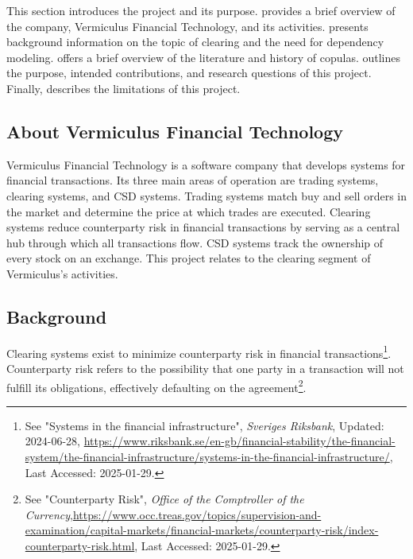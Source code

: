 This section introduces the project and its purpose.  provides a brief overview of the company, Vermiculus Financial Technology, and its activities.  presents background information on the topic of clearing and the need for dependency modeling.  offers a brief overview of the literature and history of copulas.  outlines the purpose, intended contributions, and research questions of this project. Finally,  describes the limitations of this project.

\subsection{About Vermiculus Financial Technology} \label{AboutVFT}
Vermiculus Financial Technology is a software company that develops systems for financial transactions. Its three main areas of operation are trading systems, clearing systems, and \gls{CSD} systems. Trading systems match buy and sell orders in the market and determine the price at which trades are executed. Clearing systems reduce counterparty risk in financial transactions by serving as a central hub through which all transactions flow. \gls{CSD} systems track the ownership of every stock on an exchange. This project relates to the clearing segment of Vermiculus’s activities.

\subsection{Background}\label{Background}
Clearing systems exist to minimize counterparty risk in financial transactions\footnote{See "Systems in the financial infrastructure", \textit{Sveriges Riksbank}, Updated: 2024-06-28, \url{https://www.riksbank.se/en-gb/financial-stability/the-financial-system/the-financial-infrastructure/systems-in-the-financial-infrastructure/}, Last Accessed: 2025-01-29.}. Counterparty risk refers to the possibility that one party in a transaction will not fulfill its obligations, effectively defaulting on the agreement\footnote{See "Counterparty Risk", \textit{Office of the Comptroller of the Currency},\url{https://www.occ.treas.gov/topics/supervision-and-examination/capital-markets/financial-markets/counterparty-risk/index-counterparty-risk.html}, Last Accessed: 2025-01-29.}.


